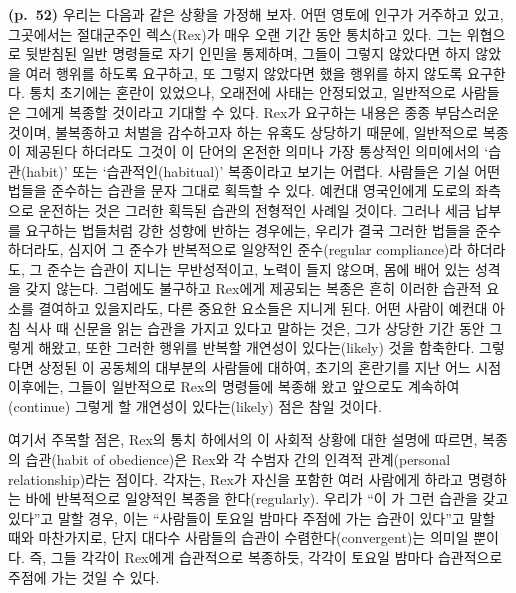 \textbf{(p.~52)} 우리는 다음과 같은 상황을 가정해 보자. 어떤 영토에
인구가 거주하고 있고, 그곳에서는 절대군주인 렉스(Rex)가 매우 오랜 기간
동안 통치하고 있다. 그는 위협으로 뒷받침된 일반 명령들로 자기 인민을
통제하며, 그들이 그렇지 않았다면 하지 않았을 여러 행위를 하도록
요구하고, 또 그렇지 않았다면 했을 행위를 하지 않도록 요구한다. 통치
초기에는 혼란이 있었으나, 오래전에 사태는 안정되었고, 일반적으로
사람들은 그에게 복종할 것이라고 기대할 수 있다. Rex가 요구하는 내용은
종종 부담스러운 것이며, 불복종하고 처벌을 감수하고자 하는 유혹도
상당하기 때문에, 일반적으로 복종이 제공된다 하더라도 그것이 이 단어의
온전한 의미나 가장 통상적인 의미에서의 ‘습관(habit)’ 또는
‘습관적인(habitual)’ 복종이라고 보기는 어렵다. 사람들은 기실 어떤 법들을
준수하는 습관을 문자 그대로 획득할 수 있다. 예컨대 영국인에게 도로의
좌측으로 운전하는 것은 그러한 획득된 습관의 전형적인 사례일 것이다.
그러나 세금 납부를 요구하는 법들처럼 강한 성향에 반하는 경우에는, 우리가
결국 그러한 법들을 준수하더라도, 심지어 그 준수가 반복적으로 일양적인
준수(regular compliance)라 하더라도, 그 준수는 습관이 지니는
무반성적이고, 노력이 들지 않으며, 몸에 배어 있는 성격을 갖지 않는다.
그럼에도 불구하고 Rex에게 제공되는 복종은 흔히 이러한 습관적 요소를
결여하고 있을지라도, 다른 중요한 요소들은 지니게 된다. 어떤 사람이
예컨대 아침 식사 때 신문을 읽는 습관을 가지고 있다고 말하는 것은, 그가
상당한 기간 동안 그렇게 해왔고, 또한 그러한 행위를 반복할 개연성이
있다는(likely) 것을 함축한다. 그렇다면 상정된 이 공동체의 대부분의
사람들에 대하여, 초기의 혼란기를 지난 어느 시점 이후에는, 그들이
일반적으로 Rex의 명령들에 복종해 왔고 앞으로도 계속하여(continue) 그렇게
할 개연성이 있다는(likely) 점은 참일 것이다.

여기서 주목할 점은, Rex의 통치 하에서의 이 사회적 상황에 대한 설명에
따르면, 복종의 습관(habit of obedience)은 Rex와 각 수범자 간의 인격적
관계(personal relationship)라는 점이다. 각자는, Rex가 자신을 포함한 여러
사람에게 하라고 명령하는 바에 반복적으로 일양적인 복종을
한다(regularly). 우리가 “이 가 그런 습관을
갖고 있다”고 말할 경우, 이는 “사람들이 토요일 밤마다 주점에 가는
습관이 있다”고 말할 때와 마찬가지로, 단지 대다수 사람들의 습관이
수렴한다(convergent)는 의미일 뿐이다. 즉, 그들 각각이 Rex에게 습관적으로
복종하듯, 각각이 토요일 밤마다 습관적으로 주점에 가는 것일 수 있다.

